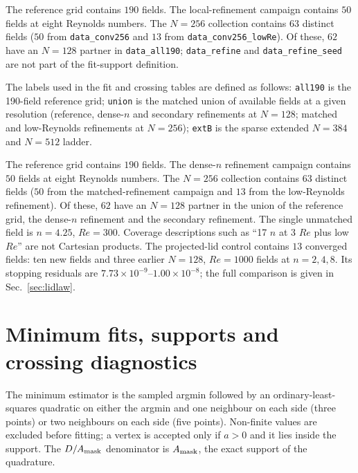 \documentclass[11pt]{article}
\begin{document}
\color{revred}The reference grid contains $190$ fields. The local-refinement campaign contains $50$ fields at eight Reynolds numbers. The $N=256$ collection contains $63$ distinct fields ($50$ from \texttt{data\_conv256} and $13$ from \texttt{data\_conv256\_lowRe}). Of these, $62$ have an $N=128$ partner in \texttt{data\_all190}; \texttt{data\_refine} and \texttt{data\_refine\_seed} are not part of the fit-support definition.\par
\color{revblue}The labels used in the fit and crossing tables are defined as follows: \texttt{all190} is the 190-field reference grid; \texttt{union} is the matched union of available fields at a given resolution (reference, dense-$n$ and secondary refinements at $N=128$; matched and low-Reynolds refinements at $N=256$); \texttt{extB} is the sparse extended $N=384$ and $N=512$ ladder.\par
\color{black}The reference grid contains $190$ fields. The dense-$n$ refinement campaign
contains $50$ fields at eight Reynolds numbers. The $N=256$ collection contains
$63$ distinct fields ($50$ from the matched-refinement campaign and $13$ from
the low-Reynolds refinement). Of these, $62$ have an $N=128$ partner in the union
of the reference grid, the dense-$n$ refinement and the secondary refinement.
The single unmatched field is $n=4.25$, $Re=300$. Coverage descriptions such
as ``17 $n$ at 3 $Re$ plus low $Re$'' are not Cartesian products. The
projected-lid control contains $13$ converged fields: ten new fields and three
earlier $N=128$, $Re=1000$ fields at $n=2,4,8$. Its stopping residuals are
$7.73\times10^{-9}$--$1.00\times10^{-8}$; the full comparison is given in
Sec.~\ref{sec:lidlaw}.
\color{black}

\section{Minimum fits, supports and crossing diagnostics}
\label{sec:fits}

The minimum estimator is the sampled argmin followed by an ordinary-least-squares
quadratic on either the argmin and one neighbour on each side (three points) or
two neighbours on each side (five points). Non-finite values are excluded
before fitting; a vertex is accepted only if $a>0$ and it lies inside the
support. The $D/A_{\rm mask}$ denominator is $A_{\rm mask}$, the exact support
of the quadrature.
\end{document}
